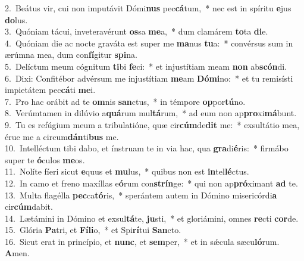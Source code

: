 {2.~}Beátus vir, cui non imputávit Dómi\textbf{nus} pec\textbf{cá}tum,~* nec est in spíritu \textbf{e}jus \textbf{do}lus.\\
{3.~}Quóniam tácui, inveteravérunt \textbf{os}sa \textbf{me}a,~* dum clamárem \textbf{to}ta \textbf{di}e.\\
{4.~}Quóniam die ac nocte graváta est super me \textbf{ma}nus \textbf{tu}a:~* convérsus sum in ærúmna mea, dum con\textbf{fí}gitur \textbf{spi}na.\\
{5.~}Delíctum meum cógnitum \textbf{ti}bi \textbf{fe}ci:~* et injustítiam meam \textbf{non} ab\textbf{scón}di.\\
{6.~}Dixi: Confitébor advérsum me injustítiam \textbf{me}am \textbf{Dó}\textbf{mi}no:~* et tu remisísti impietátem pec\textbf{cá}ti \textbf{me}i.\\
{7.~}Pro hac orábit ad te \textbf{om}nis \textbf{san}ctus,~* in témpore \textbf{op}por\textbf{tú}no.\\
{8.~}Verúmtamen in dilúvio a\textbf{quá}rum mul\textbf{tá}rum,~* ad eum non ap\textbf{pro}xi\textbf{má}bunt.\\
{9.~}Tu es refúgium meum a tribulatióne, quæ cir\textbf{cúm}de\textbf{dit} me:~* exsultátio mea, érue me a circum\textbf{dán}ti\textbf{bus} me.\\
{10.~}Intelléctum tibi dabo, et ínstruam te in via hac, qua \textbf{gra}di\textbf{é}ris:~* firmábo super te \textbf{ó}culos \textbf{me}os.\\
{11.~}Nolíte fíeri sicut \textbf{e}quus et \textbf{mu}lus,~* quibus non est \textbf{in}tel\textbf{lé}ctus.\\
{12.~}In camo et freno maxíllas e\textbf{ó}rum con\textbf{strín}ge:~* qui non ap\textbf{pró}ximant \textbf{ad} te.\\
{13.~}Multa flagélla \textbf{pec}ca\textbf{tó}ris,~* sperántem autem in Dómino misericórdi\textbf{a} cir\textbf{cúm}dabit.\\
{14.~}Lætámini in Dómino et exsul\textbf{tá}te, \textbf{ju}sti,~* et gloriámini, omnes \textbf{re}cti \textbf{cor}de.\\
{15.~}Glória \textbf{Pa}tri, et \textbf{Fí}\textbf{li}o,~* et Spi\textbf{rí}tui \textbf{San}cto.\\
{16.~}Sicut erat in princípio, et \textbf{nunc}, et \textbf{sem}per,~* et in sǽcula sæcu\textbf{ló}rum. \textbf{A}men.\\
